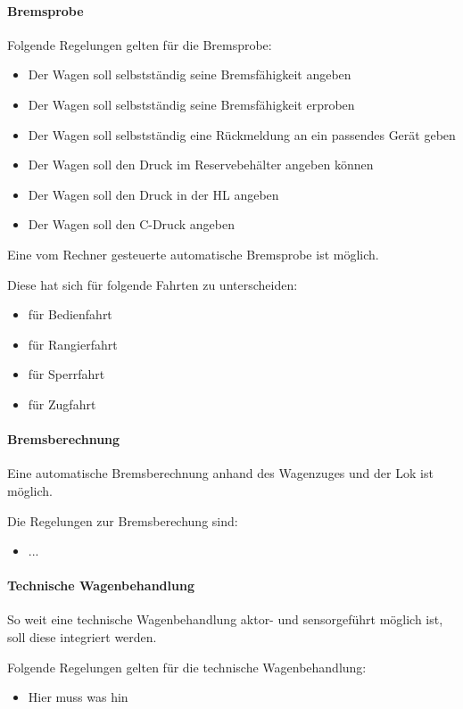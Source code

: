 \paragraph{Bremsprobe}
\begin{feat}
Folgende Regelungen gelten für die Bremsprobe:
\begin{itemize}
    \item Der Wagen soll selbstständig seine Bremsfähigkeit angeben
    \item Der Wagen soll selbstständig seine Bremsfähigkeit erproben
    \item Der Wagen soll selbstständig eine Rückmeldung an ein passendes Gerät geben
    \item Der Wagen soll den Druck im Reservebehälter angeben können
    \item Der Wagen soll den Druck in der \acrshort{HL} angeben
    \item Der Wagen soll den C-Druck angeben
\end{itemize}
\end{feat}
\begin{feat}
Eine vom Rechner gesteuerte automatische Bremsprobe ist möglich.
\end{feat}
\begin{rem} [zu Anf. 29] 
Diese hat sich für folgende Fahrten zu unterscheiden:
\begin{itemize}
    \item für Bedienfahrt
    \item für Rangierfahrt
    \item für Sperrfahrt
    \item für Zugfahrt
\end{itemize}
\end{rem}

\paragraph{Bremsberechnung}
\begin{feat}
Eine automatische Bremsberechnung anhand des Wagenzuges und der Lok ist möglich.
\end{feat}
\begin{rem} [zu Anf. 30]
Die Regelungen zur Bremsberechung sind:
\begin{itemize}
    \item ...
\end{itemize}
\end{rem}

\paragraph{Technische Wagenbehandlung}
\begin{feat}
So weit eine technische Wagenbehandlung aktor- und sensorgeführt möglich ist, soll diese integriert werden.
\end{feat}
\begin{feat}
Folgende Regelungen gelten für die technische Wagenbehandlung:
\begin{itemize}
    \item Hier muss was hin
\end{itemize}
\end{feat}

